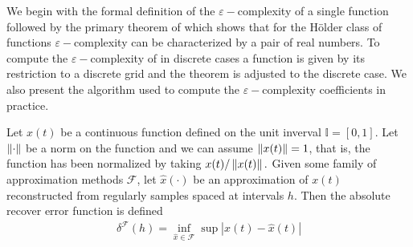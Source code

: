   
  We begin with the formal definition of the $\varepsilon-$complexity of a single function followed by the primary theorem of \cite{darkhovsky2013} which shows that for the H\"older
  class of functions $\varepsilon-$complexity can be characterized
  by a pair of real numbers. To compute the $\varepsilon-$complexity 
  of in discrete cases a function is given by its restriction 
  to a discrete grid and the theorem is adjusted to the discrete case. We also present the algorithm used to compute 
  the $\varepsilon-$complexity coefficients in practice. 


  Let $x(t)$ be a continuous function defined on the 
  unit inverval $ \mathbb{I} = [0,1]$. Let $\left\lVert\cdot\right\rVert$ be a norm on the function and we can assume $\left\lVert x(t)\right\rVert = 1$, that is, the function has been normalized 
  by taking $x(t)/\left\lVert x(t)\right\rVert.$ Given some family of approximation 
  methods $\mathcal{F}$, let $\hat x(\cdot)$ be an approximation
  of $x(t)$ reconstructed from regularly samples spaced at intervals $h$. Then the absolute recover error function is defined 
  \begin{align}
    \delta^{\mathcal{F}}(h) = \inf_{\hat x \in \mathcal{F}} 
    \sup | x(t) - \hat x(t)|
  \end{align}

